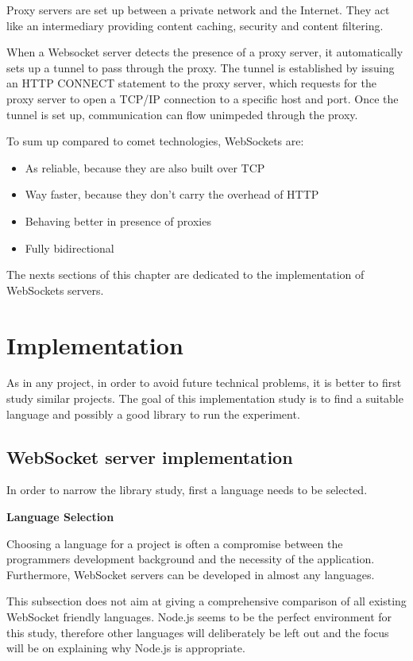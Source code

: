 Proxy servers are set up between a private network and the Internet. They act
like an intermediary providing content caching, security and content
filtering.

When a Websocket server detects the presence of a proxy server, it
automatically sets up a tunnel to pass through the proxy. The tunnel is
established by issuing an HTTP CONNECT statement to the proxy server, which
requests for the proxy server to open a TCP/IP connection to a specific host
and port. Once the tunnel is set up, communication can flow unimpeded through
the proxy.

To sum up compared to comet technologies, WebSockets are: 

\begin{itemize}
    \item As reliable, because they are also built over TCP
    \item Way faster, because they don't carry the overhead of HTTP
    \item Behaving better in presence of proxies
    \item Fully bidirectional
\end{itemize}

The nexts sections of this chapter are dedicated to the implementation of 
WebSockets servers.

\section{Implementation}

As in any project, in order to avoid future technical problems, it is better to
first study similar projects. The goal of this implementation study is to find a
suitable language and possibly a good library to run the experiment.

\subsection{WebSocket server implementation}

In order to narrow the library study, first a language needs to be selected.

\textbf{Language Selection}

Choosing a language for a project is often a compromise between the programmers
development background and the necessity of the application. Furthermore,
WebSocket servers can be developed in almost any languages.

This subsection does not aim at giving a comprehensive comparison of all
existing WebSocket friendly languages. Node.js seems to be the perfect
environment for this study, therefore other languages will deliberately be left
out and the focus will be on explaining why Node.js is appropriate.

